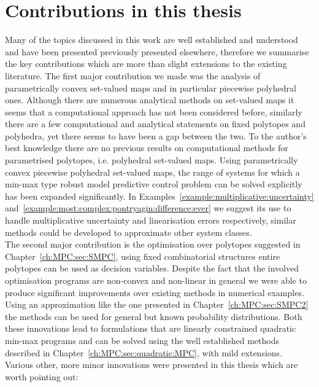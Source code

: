 \section{Contributions in this thesis}
%
%
Many of the topics discussed in this work are well established and understood and have been presented previously presented elsewhere, therefore we summarise the key contributions which are more than slight extensions to the existing literature.
%
The first major contribution we made was the analysis of parametrically convex set-valued maps and in particular piecewise polyhedral ones.
%
Although there are numerous analytical methods on set-valued maps it seems that a computational approach has not been considered before, similarly there are a few computational and analytical statements on fixed polytopes and polyhedra, yet there seems to have been a gap between the two.
%
To the author's best knowledge there are no previous results on computational methods for parametrised polytopes, i.e. polyhedral set-valued maps.
%
Using parametrically convex piecewise polyhedral set-valued maps, the range of systems for which a min-max type robust model predictive control problem can be solved explicitly has been expanded significantly. 
%
In Examples~\ref{example:multiplicative:uncertainty} and~\ref{example:most:complex:pontryagin:difference:ever} we suggest its use to handle multiplicative uncertainty and linearisation errors respectively, similar methods could be developed to approximate other system classes.
%
\\[1em]
%
The second major contribution is the optimisation over polytopes suggested in Chapter~\ref{ch:MPC:sec:SMPC}, using fixed combinatorial structures entire polytopes can be used as decision variables.
%
Despite the fact that the involved optimisation programs are non-convex and non-linear in general we were able to produce significant improvements over existing methods in numerical examples.
%
Using an approximation like the one presented in Chapter~\ref{ch:MPC:sec:SMPC2} the methods can be used for general but known probability distributions.
%
Both these innovations lead to formulations that are linearly constrained quadratic min-max programs and can be solved using the well established methods described in Chapter~\ref{ch:MPC:sec:quadratic:MPC}, with mild extensions.
%
\\[1em]
%
Various other, more minor innovations were presented in this thesis which are worth pointing out:
%
